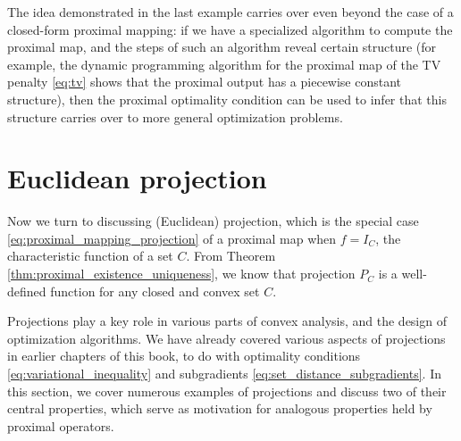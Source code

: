 The idea demonstrated in the last example carries over even beyond the case of a
closed-form proximal mapping: if we have a specialized algorithm to compute the
proximal map, and the steps of such an algorithm reveal certain structure (for
example, the dynamic programming algorithm for the proximal map of the TV
penalty \eqref{eq:tv} shows that the proximal output has a piecewise constant
structure), then the proximal optimality condition can be used to infer that
this structure carries over to more general optimization problems.  

\section{Euclidean projection}

Now we turn to discussing (Euclidean) projection, which is the special case
\eqref{eq:proximal_mapping_projection} of a proximal map when $f = I_C$, the
characteristic function of a set $C$. From Theorem
\ref{thm:proximal_existence_uniqueness}, we know that projection $P_C$ is a 
well-defined function for any closed and convex set $C$. 

Projections play a key role in various parts of convex analysis, and the design
of optimization algorithms. We have already covered various aspects of
projections in earlier chapters of this book, to do with optimality conditions 
\eqref{eq:variational_inequality} and subgradients
\eqref{eq:set_distance_subgradients}. In this section, we cover numerous
examples of projections and discuss two of their central properties, which
serve as motivation for analogous properties held by proximal operators.  


